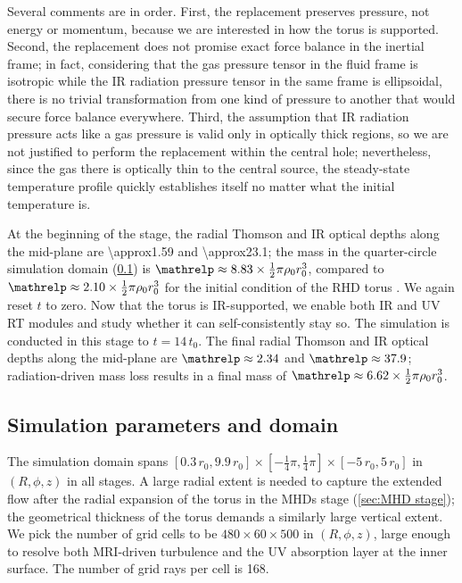 \documentclass[twocolumn]{article}
\begin{document}
Several comments are in order. First, the replacement preserves pressure, not
energy or momentum, because we are interested in how the torus is supported.
Second, the replacement does not promise exact force balance in the inertial
frame; in fact, considering that the gas pressure tensor in the fluid frame is
isotropic while the \ac{IR} radiation pressure tensor in the same frame is
ellipsoidal, there is no trivial transformation from one kind of pressure to
another that would secure force balance everywhere. Third, the assumption that
\ac{IR} radiation pressure acts like a gas pressure is valid only in optically
thick regions, so we are not justified to perform the replacement within the
central hole; nevertheless, since the gas there is optically thin to the
central source, the steady-state temperature profile quickly establishes itself
no matter what the initial temperature is.

At the beginning of the stage, the radial Thomson and \ac{IR} optical depths
along the mid-plane are \num{\approx1.59} and \num{\approx23.1}; the mass in
the quarter-circle simulation domain (\cref{sec:parameters}) is
$\mathrelp\approx8.83\times\frac12\pi\rho_0r_0^3$, compared to
$\mathrelp\approx2.10\times\frac12\pi\rho_0r_0^3$ for the initial condition of
the \ac{RHD} torus . We again reset $t$ to
zero. Now that the torus is \ac{IR}-supported, we enable both \ac{IR} and
\ac{UV} \ac{RT} modules and study whether it can self-consistently stay so. The
simulation is conducted in this stage to $t=14\,t_0$. The final radial Thomson
and \ac{IR} optical depths along the mid-plane are $\mathrelp\approx2.34$ and
$\mathrelp\approx37.9$; radiation-driven mass loss results in a final mass of
$\mathrelp\approx6.62\times\frac12\pi\rho_0r_0^3$.

\subsection{Simulation parameters and domain}
\label{sec:parameters}

The simulation domain spans
$[0.3\,r_0,9.9\,r_0]\times[-\tfrac14\pi,\frac14\pi]\times[-5\,r_0,5\,r_0]$ in
$(R,\phi,z)$ in all stages. A large radial extent is needed to capture the
extended flow after the radial expansion of the torus in the \acp{MHD} stage
(\cref{sec:MHD stage}); the geometrical thickness of the torus demands a
similarly large vertical extent. We pick the number of grid cells to be
$480\times60\times500$ in $(R,\phi,z)$, large enough to resolve both
\ac{MRI}-driven turbulence \citep[e.g.,][]{2013ApJ...772..102H} and the \ac{UV}
absorption layer at the inner surface. The number of grid rays per cell is 168.
\end{document}
